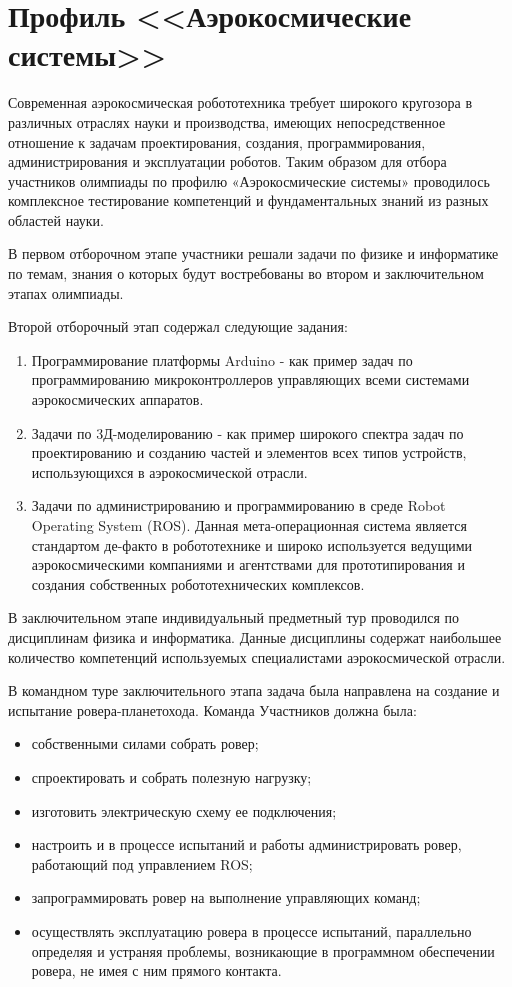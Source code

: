 

\section*{Профиль <<Аэрокосмические системы>>}

Современная аэрокосмическая робототехника требует широкого кругозора в различных отраслях науки и производства, имеющих непосредственное отношение к задачам проектирования, создания, программирования, администрирования и эксплуатации роботов. Таким образом для отбора участников олимпиады по профилю «Аэрокосмические системы» проводилось комплексное тестирование компетенций и фундаментальных знаний из разных областей науки.

В первом отборочном этапе участники решали задачи по физике и информатике по темам, знания о которых будут востребованы во втором и заключительном этапах олимпиады.

Второй отборочный этап содержал следующие задания:
\begin{enumerate}
    \item Программирование платформы Arduino - как пример задач по программированию микроконтроллеров управляющих всеми системами аэрокосмических аппаратов.
    \item Задачи по 3Д-моделированию - как пример широкого спектра задач по проектированию и созданию частей и элементов всех типов устройств, использующихся в аэрокосмической отрасли.
    \item Задачи по администрированию и программированию в среде Robot Operating System (ROS). Данная мета-операционная система является стандартом де-факто в робототехнике и широко используется ведущими аэрокосмическими компаниями и агентствами для прототипирования и создания собственных робототехнических комплексов.
\end{enumerate}

В заключительном этапе индивидуальный предметный тур проводился по дисциплинам физика и информатика. Данные дисциплины содержат наибольшее количество компетенций используемых специалистами аэрокосмической отрасли.

В командном туре заключительного этапа задача была направлена на создание и испытание ровера-планетохода. Команда Участников должна была:
\begin{itemize}
    \item собственными силами собрать ровер;
    \item спроектировать и собрать полезную нагрузку;
    \item изготовить электрическую схему ее подключения;
    \item настроить и в процессе испытаний и работы администрировать ровер, работающий под управлением ROS;
    \item запрограммировать ровер на выполнение управляющих команд;
    \item осуществлять эксплуатацию ровера в процессе испытаний, параллельно определяя и устраняя проблемы, возникающие в программном обеспечении ровера, не имея с ним прямого контакта.
\end{itemize}

